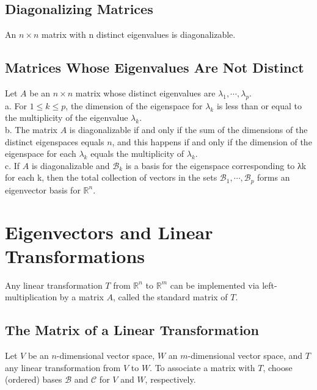\documentclass[12pt,a4paper]{article}
\begin{document}
\subsection{Diagonalizing Matrices}

\begin{tcolorbox}[colback=green!5,colframe=green!40!black,title= Theorem]
An $n\times n$ matrix with n distinct eigenvalues is diagonalizable.
\end{tcolorbox}


\subsection{Matrices Whose Eigenvalues Are Not Distinct}



\begin{tcolorbox}[colback=green!5,colframe=green!40!black,title= Theorem]
Let $A$ be an $n\times n$ matrix whose distinct eigenvalues are $\lambda_1, \cdots, \lambda_p$. \\
a. For $1 \leqslant k \leqslant p$, the dimension of the eigenspace for $\lambda_k$ is less than or equal to the multiplicity of the eigenvalue $\lambda_k$. \\
b. The matrix $A$ is diagonalizable if and only if the sum of the dimensions of the distinct eigenspaces equals $n$, and this happens if and only if the dimension of the eigenspace for each $\lambda_k$ equals the multiplicity of $\lambda_k$. \\
c. If $A$ is diagonalizable and $\mathcal B_k$ is a basis for the eigenspace corresponding to λk for each k, then the total collection of vectors in the sets $\mathcal B_1, \cdots, \mathcal B_p$ forms an eigenvector basis for $\mathbb R^n$.
\end{tcolorbox}




\section{Eigenvectors and Linear Transformations}
Any linear transformation $T$ from $\mathbb R^n$ to $\mathbb R^m$ can be implemented via left-multiplication by a matrix $A$, called the standard matrix of $T$.

\subsection{The Matrix of a Linear Transformation}
Let $V$ be an $n$-dimensional vector space, $W$ an $m$-dimensional vector space, and $T$ any linear transformation from $V$ to $W$. To associate a matrix with $T$, choose (ordered) bases $\mathcal B$ and $\mathcal C$ for $V$ and $W$, respectively.
\end{document}

